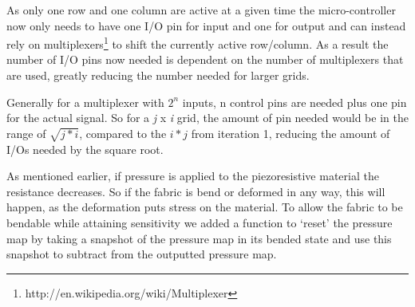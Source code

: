 As only one row and one column are active at a given time the micro-controller now only needs to have one I/O pin for input and one for output and can instead rely on multiplexers\footnote{http://en.wikipedia.org/wiki/Multiplexer} to shift the currently active row/column.
As a result the number of I/O pins now needed is dependent on the number of multiplexers that are used, greatly reducing the number needed for larger grids.

Generally for a multiplexer with \(2^n\) inputs, n control pins are needed plus one pin for the actual signal.
So for a \emph{j} x \emph{i} grid, the amount of pin needed would be in the range of \(\sqrt{j*i}\), compared to the \(i*j\) from iteration 1, reducing the amount of I/Os needed by the square root.

As mentioned earlier, if pressure is applied to the piezoresistive material the resistance decreases.
So if the fabric is bend or deformed in any way, this will happen, as the deformation puts stress on the material.
To allow the fabric to be bendable while attaining sensitivity we added a function to `reset' the pressure map by taking a snapshot of the pressure map in its bended state and use this snapshot to subtract from the outputted pressure map.

